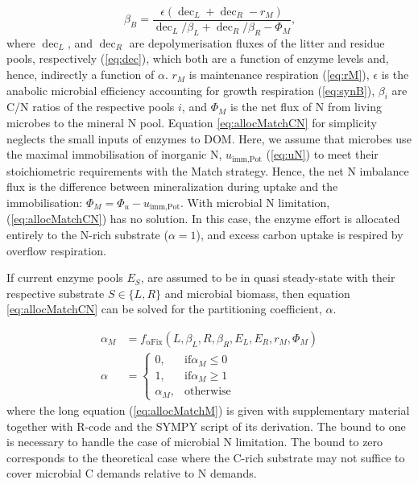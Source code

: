 \begin{equation}
\label{eq:allocMatchCN}
\beta_B = \frac{\epsilon (\operatorname{dec}_L + \operatorname{dec}_R - r_M)}{
\operatorname{dec}_L/\beta_L + \operatorname{dec}_R/\beta_R  - \Phi_M } 
\text{,}
\end{equation}
where $\operatorname{dec}_L$, and $\operatorname{dec}_R$ are depolymerisation
fluxes of the litter and residue pools, respectively (\ref{eq:dec}), which both
are a function of enzyme levels and, hence, indirectly a function of $\alpha$.
$r_M$ is maintenance respiration (\ref{eq:rM}), $\epsilon$ is the anabolic
microbial efficiency accounting for growth respiration (\ref{eq:synB}),
$\beta_i$ are C/N ratios of the respective pools $i$, and $\Phi_M$ is the net
flux of N from living microbes to the mineral N pool. Equation
\ref{eq:allocMatchCN} for simplicity neglects the small inputs of enzymes to
DOM. Here, we assume that microbes use the maximal immobilisation of inorganic
N, $u_{\operatorname{imm,Pot}}$ (\ref{eq:uN}) to meet their stoichiometric
requirements with the Match strategy.
Hence, the net N imbalance flux is the difference between mineralization during
uptake and the immobilisation:
$\Phi_M = \Phi_u - u_{\operatorname{imm,Pot}}$. With microbial N limitation,
(\ref{eq:allocMatchCN}) has no solution. In this case, the enzyme effort is
allocated entirely to the N-rich substrate ($\alpha=1$), and excess carbon
uptake is respired by overflow respiration.

If current enzyme pools $E_S$, are assumed to be in quasi steady-state with
their respective substrate $S \in \{L,R\}$ and microbial biomass, then equation
\ref{eq:allocMatchCN} can be solved for the partitioning coefficient, $\alpha$.

\begin{subequations}
\label{eq:allocMatch} 
\begin{align}
\label{eq:allocMatchM} 
\alpha_M &= f_{\operatorname{{\alpha}Fix}}(L,\beta_L,R,\beta_R, E_L, E_R, r_M,
\Phi_M)
\\
\alpha &= \begin{cases}
  0,  & \text{if} \alpha_M \le 0 \\
  1,  & \text{if} \alpha_M \ge 1 \\
  \alpha_M, & \text{otherwise}
\end{cases}   
\end{align}
\end{subequations} 
\noindent where the long equation (\ref{eq:allocMatchM}) is given with
supplementary material together with R-code and the SYMPY script of its
derivation.
The bound to one is necessary to handle the case of microbial N limitation. The
bound to zero corresponds to the theoretical case where the C-rich substrate may
not suffice to cover microbial C demands relative to N demands.

